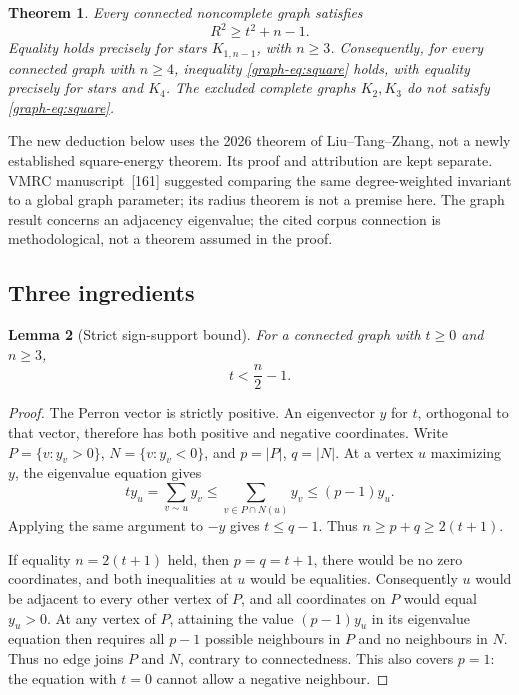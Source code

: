 \documentclass[11pt,a4paper]{article}
\newtheorem{theorem}{Theorem}[section]
\newtheorem{lemma}[theorem]{Lemma}
\theoremstyle{remark}\newtheorem{remark}[theorem]{Remark}
\numberwithin{equation}{section}
\begin{document}
\begin{theorem}\label{graph-thm:square}
Every connected noncomplete graph satisfies
\begin{equation}\label{graph-eq:square}
                R^2\ge t^2+n-1.
\end{equation}
Equality holds precisely for stars $K_{1,n-1}$, with $n\ge3$.
Consequently, for every connected graph with $n\ge4$, inequality
\eqref{graph-eq:square} holds, with equality precisely for stars and $K_4$.
The excluded complete graphs $K_2,K_3$ do not satisfy \eqref{graph-eq:square}.
\end{theorem}

The new deduction below uses the 2026 theorem of Liu--Tang--Zhang,
not a newly established square-energy theorem. Its proof and attribution
are kept separate. VMRC manuscript~[161] \cite{VMRC} suggested comparing
the same degree-weighted invariant to a global graph parameter; its
radius theorem is not a premise here. The graph result concerns an adjacency eigenvalue; the cited corpus
connection is methodological, not a theorem assumed in the proof.

\subsection{Three ingredients}
\begin{lemma}[Strict sign-support bound]\label{graph-lem:nodal}
For a connected graph with $t\ge0$ and $n\ge3$,
\[
                          t<\frac n2-1.
\]
\end{lemma}
\begin{proof}
The Perron vector is strictly positive. An eigenvector $y$ for $t$,
orthogonal to that vector, therefore has both positive and negative
coordinates. Write $P=\{v:y_v>0\}$, $N=\{v:y_v<0\}$, and
$p=|P|$, $q=|N|$.
At a vertex $u$ maximizing $y$, the eigenvalue equation gives
\[
 t y_u=\sum_{v\sim u}y_v
       \le\sum_{v\in P\cap N(u)}y_v\le(p-1)y_u.
\]
Applying the same argument to $-y$ gives $t\le q-1$.
Thus $n\ge p+q\ge2(t+1)$.

If equality $n=2(t+1)$ held, then $p=q=t+1$, there would be no
zero coordinates, and both inequalities at $u$ would be equalities.
Consequently $u$ would be adjacent to every other vertex of $P$,
and all coordinates on $P$ would equal $y_u>0$.
At any vertex of $P$, attaining the value $(p-1)y_u$ in its
eigenvalue equation then requires all $p-1$ possible neighbours in
$P$ and no neighbours in $N$. Thus no edge joins $P$ and $N$,
contrary to connectedness. This also covers $p=1$: the equation
with $t=0$ cannot allow a negative neighbour.
\end{proof}
\end{document}
